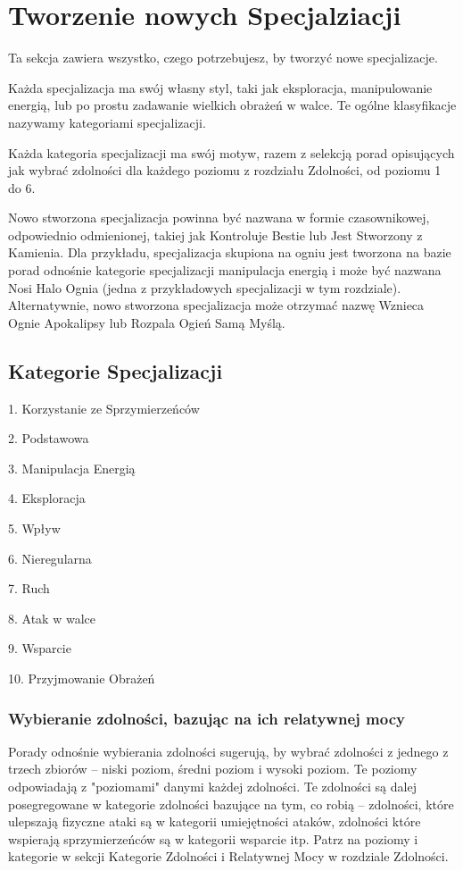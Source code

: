 \section{Tworzenie nowych Specjalziacji}

Ta sekcja zawiera wszystko, czego potrzebujesz, by tworzyć nowe specjalizacje. 

Każda specjalizacja ma swój własny styl, taki jak eksploracja, manipulowanie energią, lub po prostu zadawanie wielkich obrażeń w walce. Te ogólne klasyfikacje nazywamy kategoriami specjalizacji.

Każda kategoria specjalizacji ma swój motyw, razem z selekcją porad opisujących jak wybrać zdolności dla każdego poziomu z rozdziału Zdolności, od poziomu 1 do 6.

Nowo stworzona specjalizacja powinna być nazwana w formie czasownikowej, odpowiednio odmienionej, takiej jak Kontroluje Bestie lub Jest Stworzony z Kamienia. Dla przykładu, specjalizacja skupiona na ogniu jest tworzona na bazie porad odnośnie kategorie specjalizacji manipulacja energią i może być nazwana Nosi Halo Ognia (jedna z przykładowych specjalizacji w tym rozdziale). Alternatywnie, nowo stworzona specjalizacja może otrzymać nazwę Wznieca Ognie Apokalipsy lub Rozpala Ogień Samą Myślą. 

\subsection{Kategorie Specjalizacji}

 1. Korzystanie ze Sprzymierzeńców
   
2. Podstawowa
   
3. Manipulacja Energią
   
4. Eksploracja
   
5. Wpływ
   
6. Nieregularna
   
7. Ruch
   
8. Atak w walce
   
9. Wsparcie
   
10. Przyjmowanie Obrażeń

\subsubsection{Wybieranie zdolności, bazując na ich relatywnej mocy}

Porady odnośnie wybierania zdolności sugerują, by wybrać zdolności z jednego z trzech zbiorów – niski poziom, średni poziom i wysoki poziom. Te poziomy odpowiadają z "poziomami" danymi każdej zdolności. Te zdolności są dalej posegregowane w kategorie zdolności bazujące na tym, co robią – zdolności, które ulepszają fizyczne ataki są w kategorii umiejętności ataków, zdolności które wspierają sprzymierzeńców są w kategorii wsparcie itp. Patrz na poziomy i kategorie w sekcji Kategorie Zdolności i Relatywnej Mocy w rozdziale Zdolności.

